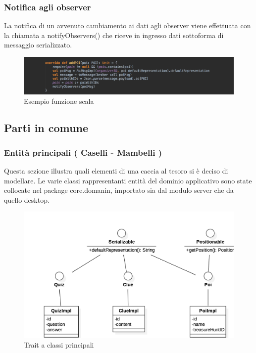 \documentclass[12pt, italian]{article}
\begin{document}
\subsubsection*{Notifica agli observer}
La notifica di un avvenuto cambiamento ai dati agli observer viene effettuata con la chiamata a notifyObservers() che riceve in ingresso dati sottoforma di messaggio serializzato.

\begin{figure}[H]
	\centering
	\includegraphics[width=1\textwidth]{img/code01.png}
	\caption{Esempio funzione scala}
\end{figure}

\subsection{Parti in comune}

\subsubsection{Entità principali ( Caselli - Mambelli )}
Questa sezione illustra quali elementi di una caccia al tesoro si è deciso di modellare.
Le varie classi rappresentanti entità del dominio applicativo sono state collocate nel package core.domanin, importato sia dal modulo server che da quello desktop.

\begin{figure}[H]
	\centering
	\includegraphics[width=1\textwidth]{img/diagram01.png}
	\caption{Trait a classi principali}
\end{figure}
\end{document}
